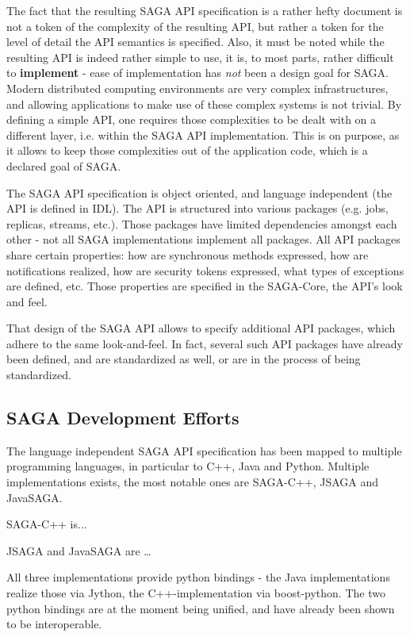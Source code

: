 \documentclass[12pt]{article}
\begin{document}
  The fact that the resulting SAGA API specification is a rather hefty
  document is not a token of the complexity of the resulting API, but
  rather a token for the level of detail the API semantics is
  specified.  Also, it must be noted while the resulting API is indeed
  rather simple to use, it is, to most parts, rather difficult to {\bf
    implement} - ease of implementation has {\it not} been a design
  goal for SAGA.  Modern distributed computing environments are very
  complex infrastructures, and allowing applications to make use of
  these complex systems is not trivial.  By defining a simple API, one
  requires those complexities to be dealt with on a different layer,
  i.e. within the SAGA API implementation. This is on purpose, as it
  allows to keep those complexities out of the application code, which
  is a declared goal of SAGA.

  The SAGA API specification is object oriented, and language
  independent (the API is defined in IDL).  The API is structured into
  various packages (e.g. jobs, replicas, streams, etc.).  Those
  packages have limited dependencies amongst each other - not all SAGA
  implementations implement all packages.  All API packages share
  certain properties: how are synchronous methods expressed, how are
  notifications realized, how are security tokens expressed, what
  types of exceptions are defined, etc.  Those properties are
  specified in the SAGA-Core, the API's look and feel.  

  That design of the SAGA API allows to specify additional API
  packages, which adhere to the same look-and-feel.  In fact, several
  such API packages have already been defined, and are standardized as
  well, or are in the process of being standardized.


 \subsection{SAGA Development Efforts}

  The language independent SAGA API specification has been mapped to
  multiple programming languages, in particular to C++, Java and
  Python.  Multiple implementations exists, the  most notable ones are
  SAGA-C++, JSAGA and JavaSAGA.

  SAGA-C++ is...

  JSAGA and JavaSAGA are …

  All three implementations provide python bindings - the Java
  implementations realize those via Jython, the C++-implementation via
  boost-python.  The two python bindings are at the moment being
  unified, and have already been shown to be interoperable.
\end{document}
